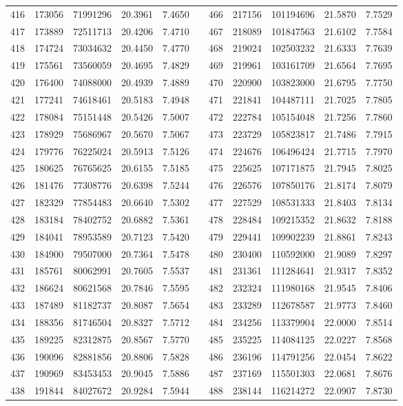 \begin{longtable}{rrrrrrrrrrr}
416&173056&71991296&20.3961&7.4650&&466&217156&101194696&21.5870&7.7529\\
417&173889&72511713&20.4206&7.4710&&467&218089&101847563&21.6102&7.7584\\
418&174724&73034632&20.4450&7.4770&&468&219024&102503232&21.6333&7.7639\\
419&175561&73560059&20.4695&7.4829&&469&219961&103161709&21.6564&7.7695\\
420&176400&74088000&20.4939&7.4889&&470&220900&103823000&21.6795&7.7750\\
421&177241&74618461&20.5183&7.4948&&471&221841&104487111&21.7025&7.7805\\
422&178084&75151448&20.5426&7.5007&&472&222784&105154048&21.7256&7.7860\\
423&178929&75686967&20.5670&7.5067&&473&223729&105823817&21.7486&7.7915\\
424&179776&76225024&20.5913&7.5126&&474&224676&106496424&21.7715&7.7970\\
425&180625&76765625&20.6155&7.5185&&475&225625&107171875&21.7945&7.8025\\
426&181476&77308776&20.6398&7.5244&&476&226576&107850176&21.8174&7.8079\\
427&182329&77854483&20.6640&7.5302&&477&227529&108531333&21.8403&7.8134\\
428&183184&78402752&20.6882&7.5361&&478&228484&109215352&21.8632&7.8188\\
429&184041&78953589&20.7123&7.5420&&479&229441&109902239&21.8861&7.8243\\
430&184900&79507000&20.7364&7.5478&&480&230400&110592000&21.9089&7.8297\\
431&185761&80062991&20.7605&7.5537&&481&231361&111284641&21.9317&7.8352\\
432&186624&80621568&20.7846&7.5595&&482&232324&111980168&21.9545&7.8406\\
433&187489&81182737&20.8087&7.5654&&483&233289&112678587&21.9773&7.8460\\
434&188356&81746504&20.8327&7.5712&&484&234256&113379904&22.0000&7.8514\\
435&189225&82312875&20.8567&7.5770&&485&235225&114084125&22.0227&7.8568\\
436&190096&82881856&20.8806&7.5828&&486&236196&114791256&22.0454&7.8622\\
437&190969&83453453&20.9045&7.5886&&487&237169&115501303&22.0681&7.8676\\
438&191844&84027672&20.9284&7.5944&&488&238144&116214272&22.0907&7.8730\\

\end{longtable}
